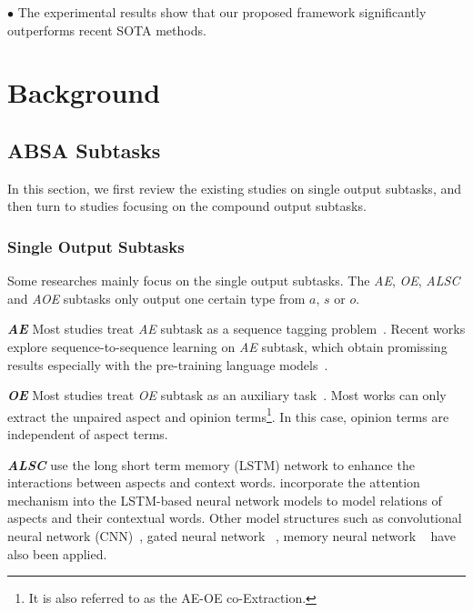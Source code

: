 \documentclass[11pt,a4paper]{article}
\begin{document}
$\bullet$ 
The experimental results show that our proposed framework significantly outperforms recent SOTA methods.





\section{Background}
\subsection{ABSA Subtasks}
In this section, we first review the existing studies on single output subtasks, and then turn to studies focusing on the compound output subtasks.

\subsubsection{Single Output Subtasks}
Some researches mainly focus on the single output subtasks. The \emph{AE}, \emph{OE}, \emph{ALSC} and \emph{AOE} subtasks only output one certain type from $a$, $s$ or $o$.

\textbf{\emph{AE}} Most studies treat \emph{AE} subtask as a  sequence tagging problem~\citep{DBLP:conf/emnlp/LiL17,DBLP:conf/acl/XuLSY18,DBLP:conf/ijcai/LiBLLY18}. Recent works explore sequence-to-sequence learning on \emph{AE} subtask, which obtain promissing results  especially with the pre-training language models~\citep{dblp:conf/acl/malwxw19, DBLP:conf/acl/LiCQLS20}.

\textbf{\emph{OE}} Most studies treat \emph{OE} subtask  as an auxiliary task~\citep{DBLP:conf/emnlp/WangPDX16,DBLP:conf/aaai/WangPDX17, DBLP:conf/acl/PanW18, DBLP:conf/acl/ChenQ20,DBLP:conf/acl/HeLND19}. Most works can only extract the unpaired aspect and opinion terms\footnote{It is also referred to as the AE-OE co-Extraction.}. In this case, opinion terms are independent of aspect terms.

\textbf{\emph{ALSC}} \citet{DBLP:conf/coling/TangQFL16} use the long short term memory (LSTM) network to enhance the interactions between aspects and context words. \citet{DBLP:conf/emnlp/WangHZZ16,DBLP:conf/eacl/ZhangL17,DBLP:conf/ijcai/MaLZW17,DBLP:conf/aaai/TayTH18a} incorporate the attention mechanism into the LSTM-based neural network models to model relations of aspects and their contextual words. Other model structures such as convolutional neural network (CNN)~\citep{DBLP:conf/acl/LamLSB18,DBLP:conf/acl/LiX18}, gated neural network ~\citep{DBLP:conf/aaai/ZhangZV16,DBLP:conf/acl/LiX18}, memory neural network ~\citep{DBLP:conf/emnlp/TangQL16,DBLP:conf/emnlp/ChenSBY17} have also been applied.
\end{document}
